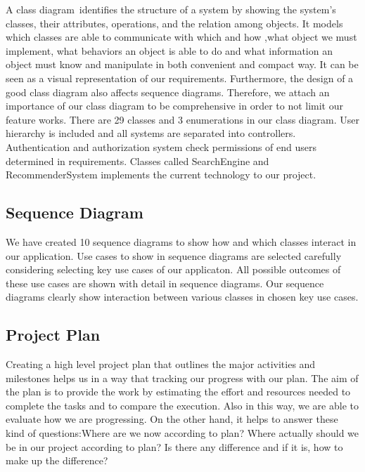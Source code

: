 \documentclass[]{article}
\begin{document}
A class diagram~identifies the structure of a system by showing the
system's classes, their attributes, operations, and the relation among
objects. It models which classes are able to communicate with which and
how ,what object we must implement, what behaviors an object is able to
do and what information an object must know and manipulate in both
convenient and compact way. It can be seen as a visual representation of
our requirements. Furthermore, the design of a good class diagram also
affects sequence diagrams. Therefore, we attach an importance of our
class diagram to be comprehensive in order to not limit our feature
works. There are 29 classes and 3 enumerations in our class diagram.
User hierarchy is included and all systems are separated into
controllers. Authentication and authorization system check permissions
of end users determined in requirements. Classes called SearchEngine and
RecommenderSystem implements the current technology to our project.

\hypertarget{sequence-diagram}{%
    \subsection{Sequence Diagram}\label{sequence-diagram}}

We have created 10 sequence diagrams to show how and which classes
interact in our application. Use cases to show in sequence diagrams are
selected carefully considering selecting key use cases of our
applicaton. All possible outcomes of these use cases are shown with
detail in sequence diagrams. Our sequence diagrams clearly show
interaction between various classes in chosen key use cases.

\hypertarget{project-plan}{%
    \subsection{Project Plan}\label{project-plan}}

Creating a high level project plan that outlines the major activities
and milestones helps us in a way that tracking our progress with our
plan. The aim of the plan is to provide the work by estimating the
effort and resources needed to complete the tasks and to compare the
execution. Also in this way, we are able to evaluate how we are
progressing. On the other hand, it helps to answer these kind of
questions:Where are we now according to plan? Where actually should we
be in our project according to plan? Is there any difference and if it
is, how to make up the difference?
\end{document}
